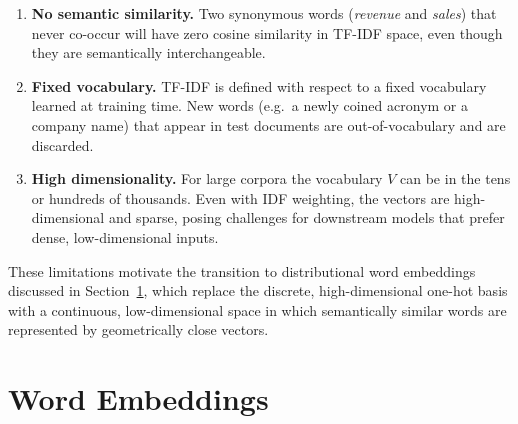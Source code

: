 \begin{deepdive}
\begin{enumerate}
  \item \textbf{No semantic similarity.}  Two synonymous words (\textit{revenue} and
    \textit{sales}) that never co-occur will have zero cosine similarity in TF-IDF space,
    even though they are semantically interchangeable.

  \item \textbf{Fixed vocabulary.}  TF-IDF is defined with respect to a fixed vocabulary
    learned at training time.  New words (e.g.\ a newly coined acronym or a company
    name) that appear in test documents are out-of-vocabulary and are discarded.

  \item \textbf{High dimensionality.}  For large corpora the vocabulary $V$ can be
    in the tens or hundreds of thousands.  Even with IDF weighting, the vectors are
    high-dimensional and sparse, posing challenges for downstream models that prefer
    dense, low-dimensional inputs.
\end{enumerate}

These limitations motivate the transition to distributional word embeddings discussed in
Section~\ref{sec:embeddings}, which replace the discrete, high-dimensional one-hot
basis with a continuous, low-dimensional space in which semantically similar words are
represented by geometrically close vectors.

\end{deepdive}

\section{Word Embeddings}
\label{sec:embeddings}

